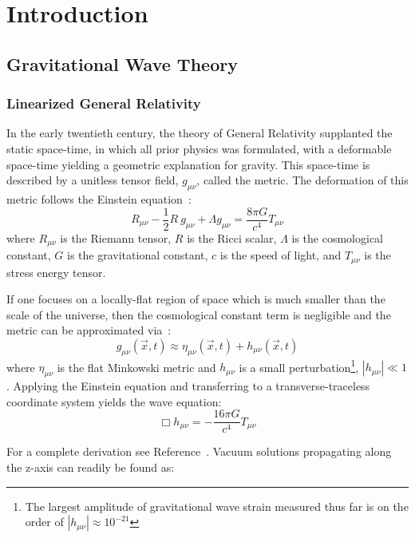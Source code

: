 \documentclass [12pt, proquest]{uwthesis}[2019]
\begin{document}
\chapter{Introduction}
\section{Gravitational Wave Theory}

\subsection{Linearized General Relativity}

In the early twentieth century, the theory of General Relativity supplanted the static space-time, in which all prior physics was formulated, with a deformable space-time yielding a geometric explanation for gravity. This space-time is described by a unitless tensor field, $g_{\mu \nu}$, called the metric. The deformation of this metric follows the Einstein equation~\cite{einsteinGR}:
\begin{equation}
R_{\mu \nu}-\frac{1}{2}R\ g_{\mu \nu}+\Lambda g_{\mu \nu}= \frac{8\pi G}{c^4} T_{\mu \nu}
\end{equation}
where $R_{\mu \nu}$ is the Riemann tensor, $R$ is the Ricci scalar, $\Lambda$ is the cosmological constant, $G$ is the gravitational constant, $c$ is the speed of light, and $T_{\mu \nu}$ is the stress energy tensor.

If one focuses on a locally-flat region of space which is much smaller than the scale of the universe, then the cosmological constant term is negligible and the metric can be approximated via~\cite{GWBook}:
\begin{equation}
g_{\mu \nu}(\vec x,t)\approx\eta_{\mu \nu}(\vec x,t)+h_{\mu \nu}(\vec x,t)
\end{equation}
where $\eta_{\mu \nu}$ is the flat Minkowski metric and $h_{\mu \nu}$ is a small perturbation\footnote{The largest amplitude of gravitational wave strain measured thus far is on the order of $|h_{\mu \nu}|\approx 10^{-21}$\cite{GW150914}}, $|h_{\mu \nu}|\ll 1$. Applying the Einstein equation and transferring to a transverse-traceless coordinate system yields the wave equation:
\begin{equation}
\Box h_{\mu \nu}=-\frac{16 \pi G}{c^4}T_{\mu \nu}
\end{equation}

For a complete derivation see Reference~\cite{GWBook}. Vacuum solutions propagating along the z-axis can readily be found as:
\end{document}
